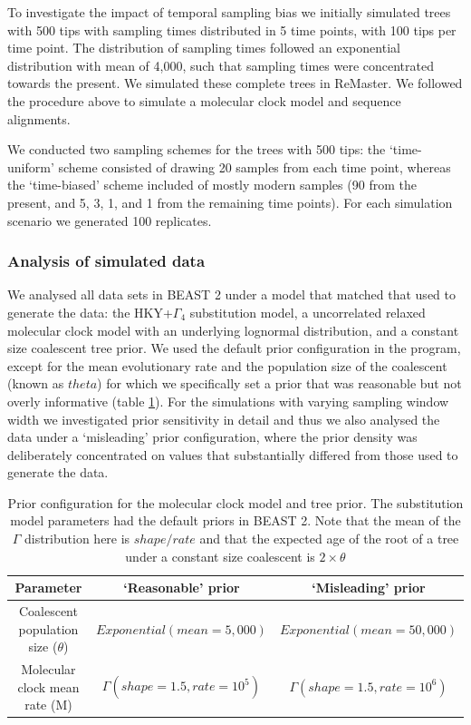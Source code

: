 \documentclass[11pt]{article}
\begin{document}
To investigate the impact of temporal sampling bias we initially simulated trees with 500 tips with sampling times distributed in 5 time points, with 100 tips per time point. The distribution of sampling times followed an exponential distribution with mean of 4,000, such that sampling times were concentrated towards the present. We simulated these complete trees in ReMaster. We followed the procedure above to simulate a molecular clock model and sequence alignments. 

We conducted two sampling schemes for the trees with 500 tips: the `time-uniform' scheme consisted of drawing 20 samples from each time point, whereas the `time-biased' scheme included of mostly modern samples (90 from the present, and 5, 3, 1, and 1 from the remaining time points). For each simulation scenario we generated 100 replicates.

\subsubsection{Analysis of simulated data}
We analysed all data sets in BEAST 2 under a model that matched that used to generate the data: the HKY+$\Gamma_4$ substitution model, a uncorrelated relaxed molecular clock model with an underlying lognormal distribution, and a constant size coalescent tree prior. We used the default prior configuration in the program, except for the mean evolutionary rate and the population size of the coalescent (known as $theta$) for which we specifically set a prior that was reasonable but not overly informative (table \ref{table:prior_distros}). For the simulations with varying sampling window width we investigated prior sensitivity in detail and thus we also analysed the data under a `misleading' prior configuration, where the prior density was deliberately concentrated on values that substantially differed from those used to generate the data.

\begin{table}[h]
	\caption{Prior configuration for the molecular clock model and tree prior. The substitution model parameters had the default priors in BEAST 2. Note that the mean of the $\Gamma$ distribution here is $shape/rate$ and that the expected age of the root of a tree under a constant size coalescent is $2\times \theta$} 
	\begin{center} 
		\label{table:prior_distros}
		\begin{tabular}{ c|c|c }
			Parameter & `Reasonable' prior & `Misleading' prior \\
			\hline
			 Coalescent population size ($\theta$) & $Exponential(mean=5,000)$ & $Exponential(mean= 50,000)$\\
			Molecular clock mean rate (M) & $\Gamma(shape=1.5, rate=10^5)$ & $\Gamma(shape=1.5, rate=10^6)$ \\
		\end{tabular}
	\end{center}	%
\end{table}
\end{document}
